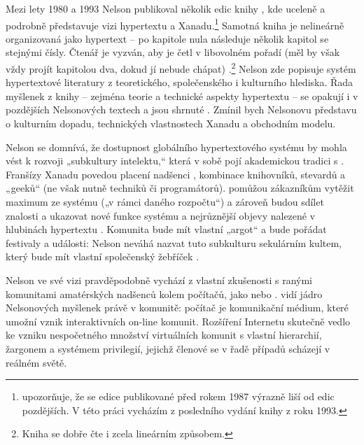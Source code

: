 Mezi lety 1980 a 1993 Nelson publikoval několik edic knihy , kde uceleně a podrobně představuje vizi hypertextu a Xanadu.\footnote{\Textcite[75]{Barnet2014} upozorňuje, že se edice publikované před rokem 1987 výrazně liší od edic pozdějších. V této práci vycházím z posledního vydání knihy z roku 1993.}
Samotná kniha je nelineárně organizovaná jako hypertext -- po kapitole nula následuje několik kapitol se stejnými čísly. Čtenář je vyzván, aby je četl v libovolném pořadí (měl by však vždy projít kapitolou dva, dokud jí nebude chápat) \autocite[Plan of This Book]{LitMachines}.\footnote{Kniha se dobře čte i zcela lineárním způsobem.} Nelson zde popisuje systém hypertextové literatury z teoretického, společenského i kulturního hlediska. Řada myšlenek z knihy -- zejména teorie a technické aspekty hypertextu -- se opakují i v pozdějších Nelsonových textech a jsou shrnuté . Zmínil bych Nelsonovu představu o kulturním dopadu, technických vlastnostech Xanadu a obchodním modelu.

Nelson se domnívá, že dostupnost globálního hypertextového systému by mohla vést k rozvoji „subkultury intelektu,“ která v sobě pojí akademickou tradici s . Franšízy Xanadu povedou placení nadšenci , kombinace knihovníků, stevardů a „geeků“ (ne však nutně techniků či programátorů).  pomůžou zákazníkům vytěžit maximum ze systému („v rámci daného rozpočtu“) a zároveň budou sdílet znalosti a ukazovat nové funkce systému a nejrůznější objevy nalezené v hlubinách hypertextu \autocite[3/16]{LitMachines}.
Komunita  bude mít vlastní „argot“ a bude pořádat festivaly a události: 
Nelson neváhá nazvat tuto subkulturu sekulárním kultem, který bude mít vlastní společenský žebříček \autocite[3/16--3/17]{LitMachines}.

Nelson ve své vizi pravděpodobně vychází z vlastní zkušenosti s ranými komunitami amatérských nadšenců kolem počítačů, jako   nebo  \autocite[260, 282]{Markoff2005}. \Textcite[14]{Rheingold1985} vidí jádro Nelsonových myšlenek právě v komunitě: počítač je komunikační médium, které umožní vznik interaktivních on-line komunit. Rozšíření Internetu skutečně vedlo ke vzniku nespočetného množství virtuálních komunit s vlastní hierarchií, žargonem a systémem privilegií, jejichž členové se v řadě případů scházejí v reálném světě.

